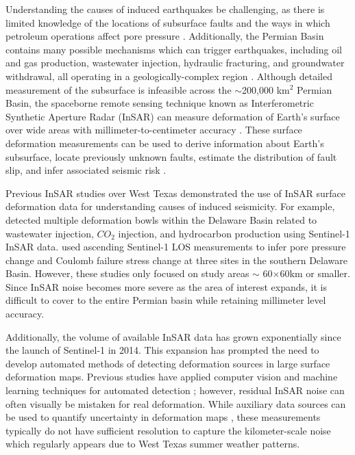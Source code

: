 Understanding the causes of induced earthquakes be challenging, as there is limited knowledge of the locations of subsurface faults and the ways in which petroleum operations affect pore pressure \citep{Hennings2021StabilityFaultSystems}. Additionally, the Permian Basin contains many possible mechanisms which can trigger earthquakes, including oil and gas production, wastewater injection, hydraulic fracturing, and groundwater withdrawal, all operating in a geologically-complex region \citep{Smye2021VariationsVerticalStress}.
Although detailed measurement of the subsurface is infeasible across the $\sim$200,000 km$^2$ Permian Basin, the spaceborne remote sensing technique known as Interferometric Synthetic Aperture Radar (InSAR) can measure deformation of Earth's surface over wide areas with millimeter-to-centimeter accuracy \citep{Massonnet1993DisplacementFieldLanders, Buergmann2000SyntheticApertureRadar}. These surface deformation measurements can be used to derive information about Earth's subsurface, locate previously unknown faults, estimate the distribution of fault slip, and infer associated seismic risk \citep{Segall2010EarthquakeVolcanoDeformation, Elliott2016RoleSpaceBased, Huang2017FaultGeometryInversion}.

Previous InSAR studies over West Texas demonstrated the use of InSAR surface deformation data for understanding causes of induced seismicity.
For example, \cite{Kim2018AssociationLocalizedGeohazards} detected multiple deformation bowls within the Delaware Basin related to wastewater injection, $CO_2$ injection, and hydrocarbon production using Sentinel-1 InSAR data. \cite{Deng2020SurfaceDeformationInduced} used ascending Sentinel-1 LOS measurements to infer pore pressure change and Coulomb failure stress change at three sites in the southern Delaware Basin. 
However, these studies only focused on study areas $ \sim $ 60$ \times $60km or smaller. Since InSAR noise becomes more severe as the area of interest expands, it is difficult to cover to the entire Permian basin while retaining millimeter level accuracy. 

Additionally, the volume of available InSAR data has grown exponentially since the launch of Sentinel-1 in 2014. This expansion has prompted the need to develop automated methods of detecting deformation sources in large surface deformation maps.
Previous studies have applied computer vision and machine learning techniques for automated detection \citep{Anantrasirichai2018ApplicationMachineLearning, RouetLeduc2021AutonomousExtractionMillimeter, Ebmeier2016ApplicationIndependentComponent}; however, residual InSAR noise can often visually be mistaken for real deformation.
While auxiliary data sources can be used to quantify uncertainty in deformation maps \citep{Barnhart2013CharacterizingEstimatingNoise, Parker2015SystematicAssessmentAtmospheric}, these measurements typically do not have sufficient resolution to capture the kilometer-scale noise which regularly appears due to West Texas summer weather patterns.

